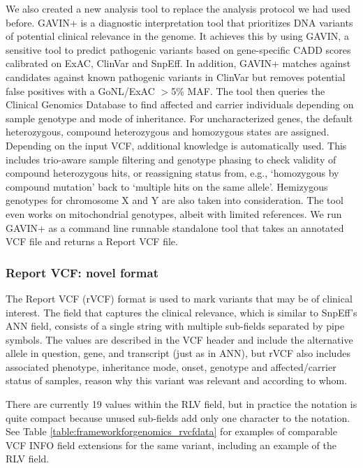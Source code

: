 We also created a new analysis tool to replace the analysis protocol we had used before.
GAVIN+ is a diagnostic interpretation tool that prioritizes DNA variants of potential clinical relevance in the genome.
It achieves this by using GAVIN\cite{van_der_Velde_2017}, a sensitive tool to predict pathogenic variants based on gene-specific CADD scores calibrated on ExAC, ClinVar and SnpEff.
In addition, GAVIN+ matches against candidates against known pathogenic variants in ClinVar but removes potential false positives with a GoNL/ExAC $>$5\% MAF.
The tool then queries the Clinical Genomics Database\cite{Solomon_2013} to find affected and carrier individuals depending on sample genotype and mode of inheritance.
For uncharacterized genes, the default heterozygous, compound heterozygous and homozygous states are assigned.
Depending on the input VCF, additional knowledge is automatically used.
This includes trio-aware sample filtering and genotype phasing to check validity of compound heterozygous hits, or reassigning status from, e.g., ‘homozygous by compound mutation’ back to ‘multiple hits on the same allele’.
Hemizygous genotypes for chromosome X and Y are also taken into consideration.
The tool even works on mitochondrial genotypes, albeit with limited references.
We run GAVIN+ as a command line runnable standalone tool that takes an annotated VCF file and returns a Report VCF file.

\subsubsection{Report VCF: novel format}

The Report VCF (rVCF) format is used to mark variants that may be of clinical interest.
The field that captures the clinical relevance, which is similar to SnpEff's ANN field, consists of a single string with multiple sub-fields separated by pipe symbols.
The values are described in the VCF header and include the alternative allele in question, gene, and transcript (just as in ANN), but rVCF also includes associated phenotype, inheritance mode, onset, genotype and affected/carrier status of samples, reason why this variant was relevant and according to whom.

There are currently 19 values within the RLV field, but in practice the notation is quite compact because unused sub-fields add only one character to the notation.
See Table \ref{table:frameworkforgenomics_rvcfdata} for examples of comparable VCF INFO field extensions for the same variant, including an example of the RLV field.

